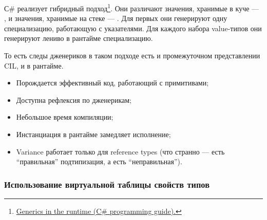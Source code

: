 С\# реализует гибридный подход\footnote{\href{https://learn.microsoft.com/en-us/dotnet/csharp/programming-guide/generics/generics-in-the-run-time}{Generics in the runtime (C\# programming guide).}}.
Они различают значения, хранимые в куче --- , и значения, хранимые на стеке --- .
Для первых они генерируют одну специализацию, работающую с указателями.
Для каждого набора value-типов они генерируют лениво в рантайме специализацию.

То есть следы дженериков в таком подходе есть и промежуточном представлении CIL, и в рантайме.

\begin{itemize}
    \item[\positive] Порождается эффективный код, работающий с примитивами;
    \item[\positive] Доступна рефлексия по дженерикам;
    \item[\positive] Небольшое время компиляции;
    \item[\negative] Инстанциация в рантайме замедляет исполнение;
    \item[\negative] Variance работает только для reference types (что странно --- есть ``правильная'' подтипизация, а есть ``неправильная'').
\end{itemize}

\subsubsection{Использование виртуальной таблицы свойств типов} \label{subsubsec:swift-generics}

